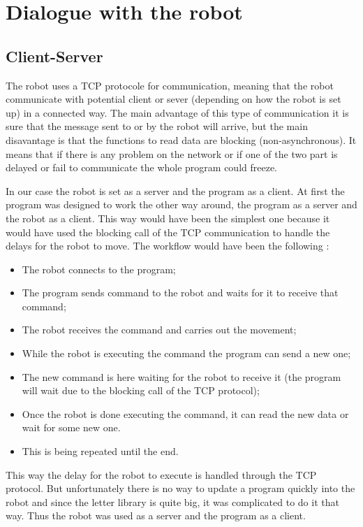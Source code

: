 \section{Dialogue with the robot}

\subsection{Client-Server}

The robot uses a TCP protocole for communication, meaning that the robot communicate with potential client or sever (depending on how the robot is set up) in a connected way. The main advantage of this type of communication it is sure that the message sent to or by the robot will arrive, but the main disavantage is that the functions to read data are blocking (non-asynchronous). It means that if there is any problem on the network or if one of the two part is delayed or fail to communicate the whole program could freeze.

In our case the robot is set as a server and the program as a client. At first the program was designed to work the other way around, the program as a server and the robot as a client. This way would have been the simplest one because it would have used the blocking call of the TCP communication to handle the delays for the robot to move.
The workflow would have been the following :
\begin{itemize}
    \item The robot connects to the program;
    \item The program sends command to the robot and waits for it to receive that command;
    \item The robot receives the command and carries out the movement;
    \item While the robot is executing the command the program can send a new one;
    \item The new command is here waiting for the robot to receive it (the program will wait due to the blocking call of the TCP protocol);
    \item Once the robot is done executing the command, it can read the new data or wait for some new one.
    \item This is being repeated until the end.
\end{itemize}

This way the delay for the robot to execute is handled through the TCP protocol. But unfortunately there is no way to update a program quickly into the robot and since the letter library is quite big, it was complicated to do it that way. Thus the robot was used as a server and the program as a client.

